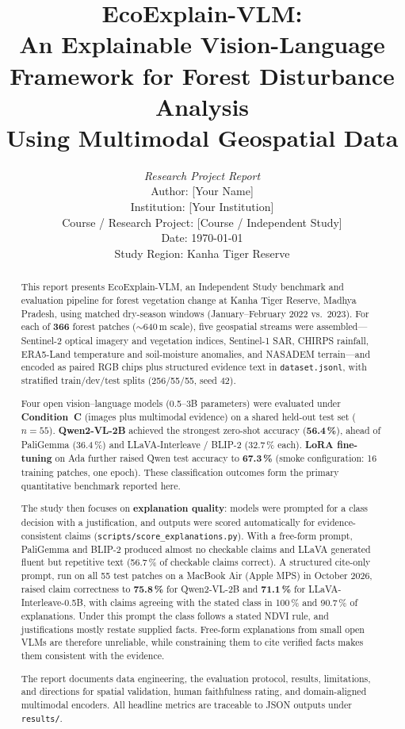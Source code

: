 \documentclass[11pt]{article}
\title{
\textbf{EcoExplain-VLM:}\\
An Explainable Vision-Language Framework for Forest Disturbance Analysis\\
Using Multimodal Geospatial Data
}
\author{
\textit{Research Project Report}\\[0.5em]
Author: [Your Name]\\
Institution: [Your Institution]\\
Course / Research Project: [Course / Independent Study]\\
Date: \today\\
Study Region: Kanha Tiger Reserve
}
\date{}
\begin{document}
\maketitle

\begin{abstract}
This report presents EcoExplain-VLM, an Independent Study benchmark and evaluation pipeline for forest vegetation change at Kanha Tiger Reserve, Madhya Pradesh, using matched dry-season windows (January--February 2022 vs.\ 2023). For each of \textbf{366} forest patches ($\sim$640\,m scale), five geospatial streams were assembled---Sentinel-2 optical imagery and vegetation indices, Sentinel-1 SAR, CHIRPS rainfall, ERA5-Land temperature and soil-moisture anomalies, and NASADEM terrain---and encoded as paired RGB chips plus structured evidence text in \texttt{dataset.jsonl}, with stratified train/dev/test splits (256/55/55, seed 42).

Four open vision--language models (0.5--3B parameters) were evaluated under \textbf{Condition~C} (images plus multimodal evidence) on a shared held-out test set ($n=55$). \textbf{Qwen2-VL-2B} achieved the strongest zero-shot accuracy (\textbf{56.4\,\%}), ahead of PaliGemma (36.4\,\%) and LLaVA-Interleave / BLIP-2 (32.7\,\% each). \textbf{LoRA fine-tuning} on Ada further raised Qwen test accuracy to \textbf{67.3\,\%} (smoke configuration: 16 training patches, one epoch). These classification outcomes form the primary quantitative benchmark reported here.

The study then focuses on \textbf{explanation quality}: models were prompted for a class decision with a justification, and outputs were scored automatically for evidence-consistent claims (\texttt{scripts/score\_explanations.py}). With a free-form prompt, PaliGemma and BLIP-2 produced almost no checkable claims and LLaVA generated fluent but repetitive text (56.7\,\% of checkable claims correct). A structured cite-only prompt, run on all 55 test patches on a MacBook Air (Apple MPS) in October 2026, raised claim correctness to \textbf{75.8\,\%} for Qwen2-VL-2B and \textbf{71.1\,\%} for LLaVA-Interleave-0.5B, with claims agreeing with the stated class in 100\,\% and 90.7\,\% of explanations. Under this prompt the class follows a stated NDVI rule, and justifications mostly restate supplied facts. Free-form explanations from small open VLMs are therefore unreliable, while constraining them to cite verified facts makes them consistent with the evidence.

The report documents data engineering, the evaluation protocol, results, limitations, and directions for spatial validation, human faithfulness rating, and domain-aligned multimodal encoders. All headline metrics are traceable to JSON outputs under \texttt{results/}.
\end{abstract}
\end{document}
